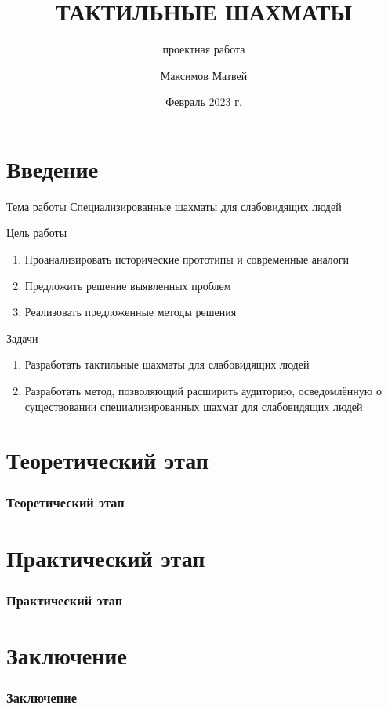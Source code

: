 \documentclass{beamer}
\title[тактильные шахматы]{ТАКТИЛЬНЫЕ ШАХМАТЫ}
\subtitle{проектная работа}
\author{Максимов Матвей}
\institute[МБОУ СОШ №73]{%
    Муниципальное бюджетное общеобразовательное учреждение\\
    <<Средняя общеобразовательная школа №73>>}
\date{Февраль 2023 г.}
\begin{document}
\frame{\titlepage}

\section{Введение}

\begin{frame}
    \begin{block}{Тема работы}
        Специализированные шахматы для слабовидящих людей
    \end{block}\pause%

    \begin{block}{Цель работы}
        \begin{enumerate}
            \item Проанализировать исторические прототипы и современные аналоги
            \item Предложить решение выявленных проблем
            \item Реализовать предложенные методы решения
        \end{enumerate}
    \end{block}
\end{frame}

\begin{frame}
    \begin{block}{Задачи}
        \begin{enumerate}
            \item Разработать тактильные шахматы для слабовидящих людей
            \item Разработать метод, позволяющий расширить аудиторию, осведомлённую
                о существовании специализированных шахмат для слабовидящих людей
        \end{enumerate}
    \end{block}
\end{frame}

\section{Теоретический этап}

\begin{frame}
    \frametitle{Теоретический этап}
\end{frame}

\section{Практический этап}

\begin{frame}
    \frametitle{Практический этап}
\end{frame}

\section{Заключение}

\begin{frame}
    \frametitle{Заключение}
\end{frame}
\end{document}
